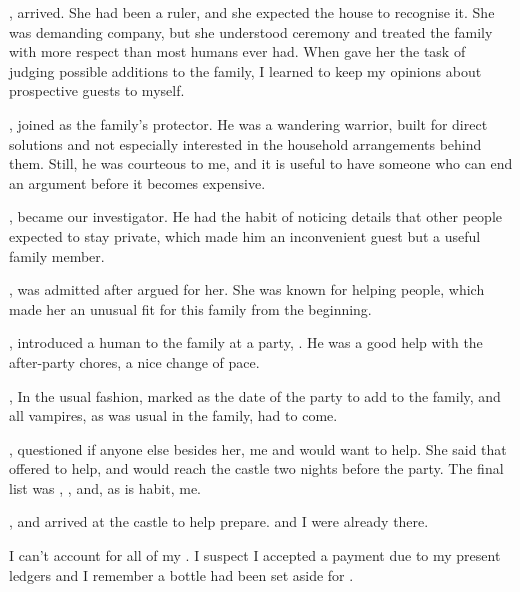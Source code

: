 {,  arrived. She had been a ruler, and she expected the house to recognise it. She was demanding company, but she understood ceremony and treated the family with more respect than most humans ever had. When  gave her the task of judging possible additions to the family, I learned to keep my opinions about prospective guests to myself.

,  joined as the family's protector. He was a wandering warrior, built for direct solutions and not especially interested in the household arrangements behind them. Still, he was courteous to me, and it is useful to have someone who can end an argument before it becomes expensive.

,  became our investigator. He had the habit of noticing details that other people expected to stay private, which made him an inconvenient guest but a useful family member.

,  was admitted after  argued for her. She was known for helping people, which made her an unusual fit for this family from the beginning.

,  introduced a human to the family at a party, . He was a good help with the after-party chores, a nice change of pace.


, In the usual fashion, marked  as the date of the party to add  to the family, and all vampires, as was usual in the family, had to come. 


,  questioned if anyone else besides her, me and  would want to help. She said that  offered to help, and would reach the castle two nights before the party. The final list was , ,  and, as is habit, me.


,  and  arrived at the castle to help prepare.  and I were already there.

I can't account for all of my . I suspect I accepted a payment due to my present ledgers and I remember a bottle had been set aside for .

}
